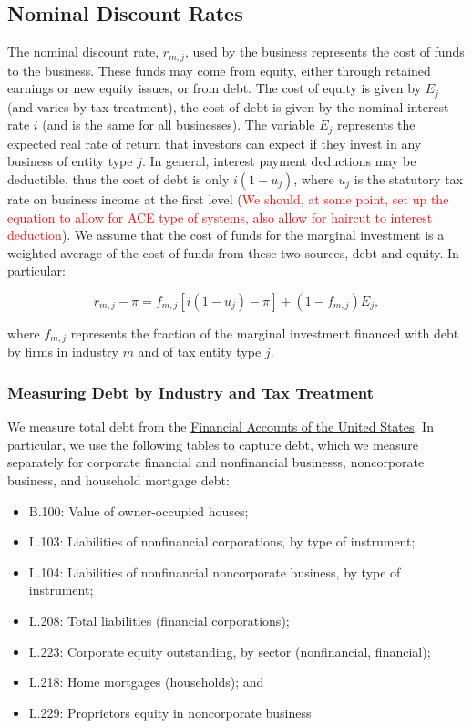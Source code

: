 \documentclass[article,11pt,letterpaper,fleqn]{article}
\theoremstyle{definition}
\numberwithin{equation}{section}
\begin{document}
\subsection{Nominal Discount Rates}

The nominal discount rate, $r_{m,j}$, used by the business represents the cost of funds to the business.  These funds may come from equity, either through retained earnings or new equity issues, or from debt.  The cost of equity is given by $E_{j}$ (and varies by tax treatment), the cost of debt is given by the nominal interest rate $i$ (and is the same for all businesses).  The variable $E_{j}$ represents the expected real rate of return that investors can expect if they invest in any business of entity type $j$.  In general, interest payment deductions may be deductible, thus the cost of debt is only $i(1-u_{j})$, where $u_{j}$ is the statutory tax rate on business income at the first level (\textcolor{red}{We should, at some point, set up the equation to allow for ACE type of systems, also allow for haircut to interest deduction}).  We assume that the cost of funds for the marginal investment is a weighted average of the cost of funds from these two sources, debt and equity.  In particular:

\begin{equation}
r_{m,j}-\pi = f_{m,j}\left[i(1-u_{j})-\pi\right] + (1-f_{m,j})E_{j},
\end{equation}

\noindent\noindent where $f_{m,j}$ represents the fraction of the marginal investment financed with debt by firms in industry $m$ and of tax entity type $j$.

\subsubsection{Measuring Debt by Industry and Tax Treatment}
\label{sec:step3}

We measure total debt from the \href{http://www.federalreserve.gov/apps/fof/FOFTables.aspx}{Financial Accounts of the United States}.  In particular, we use the following tables to capture debt, which we measure separately for corporate financial and nonfinancial businesss, noncorporate business, and household mortgage debt:

\begin{itemize}
\item B.100: Value of owner-occupied houses;
\item L.103: Liabilities of nonfinancial corporations, by type of instrument;
\item L.104: Liabilities of nonfinancial noncorporate business, by type of instrument;
\item L.208: Total liabilities (financial corporations);
\item L.223: Corporate equity outstanding, by sector (nonfinancial, financial);
\item L.218: Home mortgages (households); and
\item L.229: Proprietors equity in noncorporate business
\end{itemize}
\end{document}
